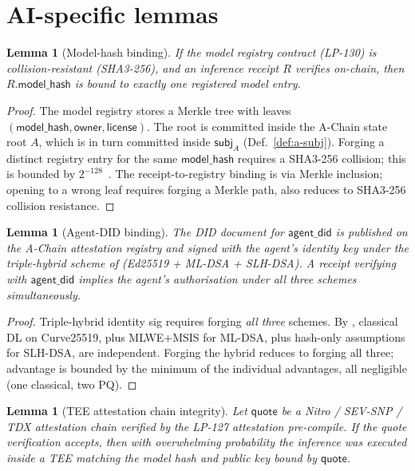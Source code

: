 \documentclass[11pt]{article}
\newtheorem{lemma}[theorem]{Lemma}
\begin{document}
\section{AI-specific lemmas}
\label{sec:lemmas}

\begin{lemma}[Model-hash binding]
\label{lem:model-hash}
If the model registry contract (LP-130) is collision-resistant
(SHA3-256), and an inference receipt $R$ verifies on-chain, then
$R.\mathsf{model\_hash}$ is bound to exactly one registered model
entry.
\end{lemma}

\begin{proof}
The model registry stores a Merkle tree with leaves
$(\mathsf{model\_hash}, \mathsf{owner}, \mathsf{license})$. The root
is committed inside the A-Chain state root $A$, which is in turn
committed inside $\mathsf{subj}_A$ (Def.~\ref{def:a-subj}). Forging a
distinct registry entry for the same $\mathsf{model\_hash}$ requires a
SHA3-256 collision; this is bounded by
$2^{-128}$~\cite{nist-hash}. The receipt-to-registry binding is via
Merkle inclusion; opening to a wrong leaf requires forging a Merkle
path, also reduces to SHA3-256 collision resistance.
\end{proof}

\begin{lemma}[Agent-DID binding]
\label{lem:agent-did}
The DID document for $\mathsf{agent\_did}$ is published on the
A-Chain attestation registry and signed with the agent's identity
key under the triple-hybrid scheme of
\cite[Crypto/Hybrid.lean]{lux-lean} (Ed25519 + ML-DSA + SLH-DSA).
A receipt verifying with $\mathsf{agent\_did}$ implies the agent's
authorisation under all three schemes simultaneously.
\end{lemma}

\begin{proof}
Triple-hybrid identity sig requires forging \emph{all three}
schemes. By \cite[Theorem 1]{lux-lean-hybrid}, classical DL on
Curve25519, plus MLWE+MSIS for ML-DSA, plus hash-only assumptions
for SLH-DSA, are independent. Forging the hybrid reduces to
forging all three; advantage is bounded by the minimum of the
individual advantages, all negligible (one classical, two PQ).
\end{proof}

\begin{lemma}[TEE attestation chain integrity]
\label{lem:tee}
Let $\mathsf{quote}$ be a Nitro / SEV-SNP / TDX attestation chain
verified by the LP-127 attestation pre-compile. If the quote
verification accepts, then with overwhelming probability the
inference was executed inside a TEE matching the model hash and
public key bound by $\mathsf{quote}$.
\end{lemma}
\end{document}

